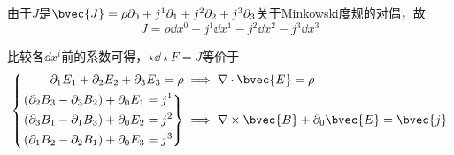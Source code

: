 由于$J$是$\bvec{J}=\rho\partial_0+j^1\partial_1+j^2\partial_2+j^3\partial_3$关于Minkowski度规的对偶，故
\begin{equation}
J = \rho\dd x^0 - j^1\dd x^1 - j^2\dd x^2 - j^3\dd x^3
\end{equation}

比较各$\dd x^i$前的系数可得，$\star \dd \star F = J$等价于
\begin{equation}
\left\{
\begin{aligned}
\partial_1E_1+\partial_2E_2+\partial_3E_3 = \rho&\implies \nabla\cdot \bvec{E}=\rho\\
\left.
\begin{aligned}
(\partial_2B_3-\partial_3B_2)+\partial_0E_1 ={}& j^1\\
(\partial_3B_1-\partial_1B_3)+\partial_0E_2 ={}& j^2\\
(\partial_1B_2-\partial_2B_1)+\partial_0E_3 ={}& j^3
\end{aligned}
\right\}&
\implies \nabla\times \bvec{B}+\partial_0\bvec{E}=\bvec{j}
\end{aligned}
\right. 
\end{equation}

















